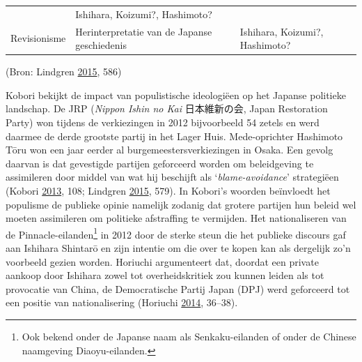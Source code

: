 \documentclass[10.5pt,dutch,]{article}
\begin{document}
\begin{longtable}[]{@{}lll@{}}
\begin{minipage}[t]{0.35\columnwidth}
\strut\end{minipage} &
\begin{minipage}[t]{0.35\columnwidth}\raggedright\strut
Ishihara, Koizumi?, Hashimoto?
\strut\end{minipage}\tabularnewline
\begin{minipage}[t]{0.21\columnwidth}\raggedright\strut
Revisionisme
\strut\end{minipage} &
\begin{minipage}[t]{0.35\columnwidth}\raggedright\strut
Herinterpretatie van de Japanse geschiedenis
\strut\end{minipage} &
\begin{minipage}[t]{0.35\columnwidth}\raggedright\strut
Ishihara, Koizumi?, Hashimoto?
\strut\end{minipage}\tabularnewline
\bottomrule
\end{longtable}

(Bron: Lindgren
\protect\hyperlink{ref-lindgrenux5fdevelopingux5f2015}{2015}, 586)

Kobori bekijkt de impact van populistische ideologiëen op het Japanse
politieke landschap. De JRP (\emph{Nippon Ishin no Kai} 日本維新の会,
Japan Restoration Party) won tijdens de verkiezingen in 2012
bijvoorbeeld 54 zetels en werd daarmee de derde grootste partij in het
Lager Huis. Mede-oprichter Hashimoto Tōru won een jaar eerder al
burgemeestersverkiezingen in Osaka. Een gevolg daarvan is dat gevestigde
partijen geforceerd worden om beleidgeving te assimileren door middel
van wat hij beschijft als `\emph{blame-avoidance}' strategiëen (Kobori
\protect\hyperlink{ref-koboriux5fpopulismux5f2013}{2013}, 108; Lindgren
\protect\hyperlink{ref-lindgrenux5fdevelopingux5f2015}{2015}, 579). In
Kobori's woorden beïnvloedt het populisme de publieke opinie namelijk
zodanig dat grotere partijen hun beleid wel moeten assimileren om
politieke afstraffing te vermijden. Het nationaliseren van de
Pinnacle-eilanden\footnote{Ook bekend onder de Japanse naam als
  Senkaku-eilanden of onder de Chinese naamgeving Diaoyu-eilanden.} in
2012 door de sterke steun die het publieke discours gaf aan Ishihara
Shintarō en zijn intentie om die over te kopen kan als dergelijk zo'n
voorbeeld gezien worden. Horiuchi argumenteert dat, doordat een private
aankoop door Ishihara zowel tot overheidskritiek zou kunnen leiden als
tot provocatie van China, de Democratische Partij Japan (DPJ) werd
geforceerd tot een positie van nationalisering (Horiuchi
\protect\hyperlink{ref-horiuchiux5fpublicux5f2014}{2014}, 36--38).
\end{document}
